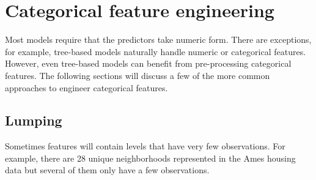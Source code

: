 \documentclass[]{krantz}
\makeatletter
\newenvironment{Shaded}{\begin{snugshade}}{\end{snugshade}}
\newcommand{\CommentTok}[1]{\textcolor[rgb]{0.37,0.37,0.37}{\textit{#1}}}
\newcommand{\KeywordTok}[1]{\textcolor[rgb]{0.27,0.27,0.27}{\textbf{#1}}}
\newcommand{\NormalTok}[1]{#1}
\newcommand{\OperatorTok}[1]{\textcolor[rgb]{0.43,0.43,0.43}{\textbf{#1}}}
\newcommand{\StringTok}[1]{\textcolor[rgb]{0.5,0.5,0.5}{#1}}
\newenvironment{kframe}{%
\medskip{}
\setlength{\fboxsep}{.8em}
 \def\at@end@of@kframe{}%
 \ifinner\ifhmode%
  \def\at@end@of@kframe{\end{minipage}}%
  \begin{minipage}{\columnwidth}%
 \fi\fi%
 \def\FrameCommand##1{\hskip\@totalleftmargin \hskip-\fboxsep
 \colorbox{shadecolor}{##1}\hskip-\fboxsep
     \hskip-\linewidth \hskip-\@totalleftmargin \hskip\columnwidth}%
 \MakeFramed {\advance\hsize-\width
   \@totalleftmargin\z@ \linewidth\hsize
   \@setminipage}}%
 {\par\unskip\endMakeFramed%
 \at@end@of@kframe}
\renewenvironment{Shaded}{\begin{kframe}}{\end{kframe}}
\makeatother
\begin{document}
\begin{Shaded}
\end{Shaded}

\hypertarget{categorical-feature-engineering}{%
\section{Categorical feature engineering}\label{categorical-feature-engineering}}

Most models require that the predictors take numeric form. There are exceptions, for example, tree-based models naturally handle numeric or categorical features. However, even tree-based models can benefit from pre-processing categorical features. The following sections will discuss a few of the more common approaches to engineer categorical features.

\hypertarget{lumping}{%
\subsection{Lumping}\label{lumping}}

Sometimes features will contain levels that have very few observations. For example, there are 28 unique neighborhoods represented in the Ames housing data but several of them only have a few observations.

\begin{Shaded}
\end{Shaded}
\end{document}
